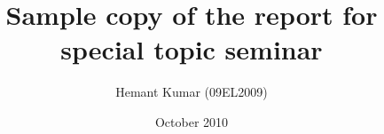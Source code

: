 \clearpage%

\title{Sample copy of the report for special topic seminar}
\author{Hemant Kumar (09EL2009)}

\date{October 2010}



\maketitle

